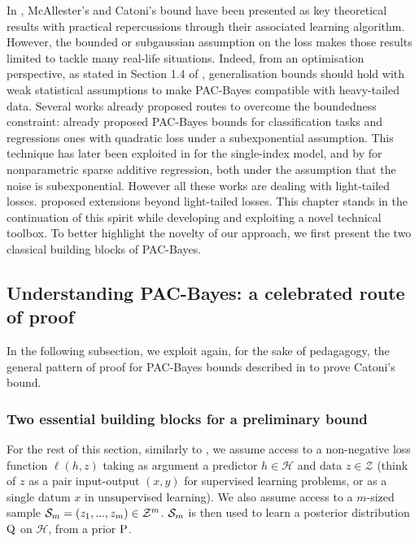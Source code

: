 In , McAllester's and Catoni's bound \citep{mcallester2003pac,catoni2007pac} have been presented as key theoretical results with practical repercussions through their associated learning algorithm. However, the bounded or subgaussian assumption on the loss makes those results limited to tackle many real-life situations.
Indeed, from an optimisation perspective, as stated in Section 1.4 of , generalisation bounds should hold with weak statistical assumptions to make PAC-Bayes compatible with heavy-tailed data. Several works already proposed routes to overcome the boundedness constraint:  \citet[][Chapter 5]{catoni2004statistical} already proposed PAC-Bayes bounds for classification tasks and regressions ones with quadratic loss under a subexponential assumption. This technique has later been exploited in \citet{alquier2013sparse} for the single-index model, and by \citet{guedj2013pac} for nonparametric sparse additive regression, both under the assumption that the noise is subexponential. However all these works are dealing with light-tailed losses.
\citet{alquier2018simpler,holland2019pac, kuzborskij2019efron, haddouche2021pac} proposed extensions beyond light-tailed losses.
This chapter stands in the continuation of this spirit while developing and exploiting a novel technical toolbox.
To better highlight the novelty of our approach, we first present the two classical building blocks of PAC-Bayes.

\subsection{Understanding PAC-Bayes: a celebrated route of proof}
In the following subsection, we exploit again, for the sake of pedagagogy, the general pattern of proof for PAC-Bayes bounds described in  to prove Catoni's bound. 
\subsubsection{Two essential building blocks for a preliminary bound}

For the rest of this section, similarly to , we assume access to a non-negative loss function $\ell(h,z)$ taking as argument a predictor $h\in\mathcal{H}$  and data $z\in\mathcal{Z}$ (think of $z$ as a pair input-output $(x,y)$ for supervised learning problems, or as a single datum $x$ in unsupervised learning). We also assume access to a $m$-sized sample $\Sm= (z_1,...,z_m)\in\mathcal{Z}^m$. $\Sm$ is then used to learn a posterior distribution $\Q$ on $\mathcal{H}$, from a prior $\P$.


